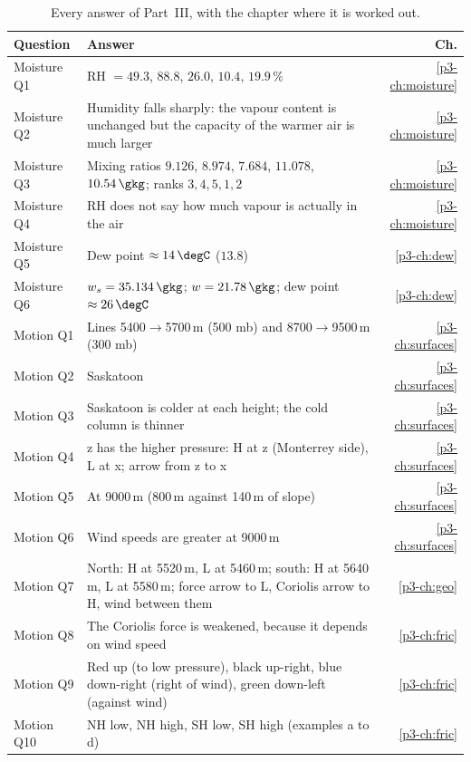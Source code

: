 \begin{table}[ht]
\centering
\caption{Every answer of Part~III, with the chapter where it is worked out.}\label{p3-tab:summary}
\small
\begin{tabularx}{\textwidth}{@{}lXr@{}}
\toprule
\textbf{Question} & \textbf{Answer} & \textbf{Ch.}\\
\midrule
Moisture Q1 & RH $=49.3$, $88.8$, $26.0$, $10.4$, $19.9\,\%$ & \ref{p3-ch:moisture}\\
Moisture Q2 & Humidity falls sharply: the vapour content is unchanged but the capacity of the warmer air is much larger & \ref{p3-ch:moisture}\\
Moisture Q3 & Mixing ratios $9.126$, $8.974$, $7.684$, $11.078$, $10.54\,\gkg$; ranks $3,4,5,1,2$ & \ref{p3-ch:moisture}\\
Moisture Q4 & RH does not say how much vapour is actually in the air & \ref{p3-ch:moisture}\\
Moisture Q5 & Dew point $\approx14\,\degC$ ($13.8$) & \ref{p3-ch:dew}\\
Moisture Q6 & $w_s=35.134\,\gkg$; $w=21.78\,\gkg$; dew point $\approx26\,\degC$ & \ref{p3-ch:dew}\\
Motion Q1 & Lines 5400$\to$5700\,m (500 mb) and 8700$\to$9500\,m (300 mb) & \ref{p3-ch:surfaces}\\
Motion Q2 & Saskatoon & \ref{p3-ch:surfaces}\\
Motion Q3 & Saskatoon is colder at each height; the cold column is thinner & \ref{p3-ch:surfaces}\\
Motion Q4 & z has the higher pressure: H at z (Monterrey side), L at x; arrow from z to x & \ref{p3-ch:surfaces}\\
Motion Q5 & At 9000\,m (800\,m against 140\,m of slope) & \ref{p3-ch:surfaces}\\
Motion Q6 & Wind speeds are greater at 9000\,m & \ref{p3-ch:surfaces}\\
Motion Q7 & North: H at 5520\,m, L at 5460\,m; south: H at 5640\,m, L at 5580\,m; force arrow to L, Coriolis arrow to H, wind between them & \ref{p3-ch:geo}\\
Motion Q8 & The Coriolis force is weakened, because it depends on wind speed & \ref{p3-ch:fric}\\
Motion Q9 & Red up (to low pressure), black up-right, blue down-right (right of wind), green down-left (against wind) & \ref{p3-ch:fric}\\
Motion Q10 & NH low, NH high, SH low, SH high (examples a to d) & \ref{p3-ch:fric}\\

\end{tabularx}
\end{table}
